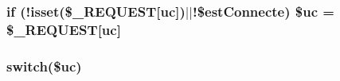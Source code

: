 \subsubsection[{\texorpdfstring{\$uc}{$uc}}]{\setlength{\rightskip}{0pt plus 5cm}if (!isset(\$\+\_\+\+R\+E\+Q\+U\+E\+ST\mbox{[}\textquotesingle{}uc\textquotesingle{}\mbox{]})$\vert$$\vert$!\${\bf est\+Connecte}) \$uc = \$\+\_\+\+R\+E\+Q\+U\+E\+ST\mbox{[}\textquotesingle{}uc\textquotesingle{}\mbox{]}}\hypertarget{index_8php_a85772ca7b85c824f39906410cb9c74e3}{}\label{index_8php_a85772ca7b85c824f39906410cb9c74e3}
\subsubsection[{\texorpdfstring{switch}{switch}}]{\setlength{\rightskip}{0pt plus 5cm}switch(\$uc)}\hypertarget{index_8php_a6160ae6d9a60bbcc19780fa9bc2c9b41}{}\label{index_8php_a6160ae6d9a60bbcc19780fa9bc2c9b41}
